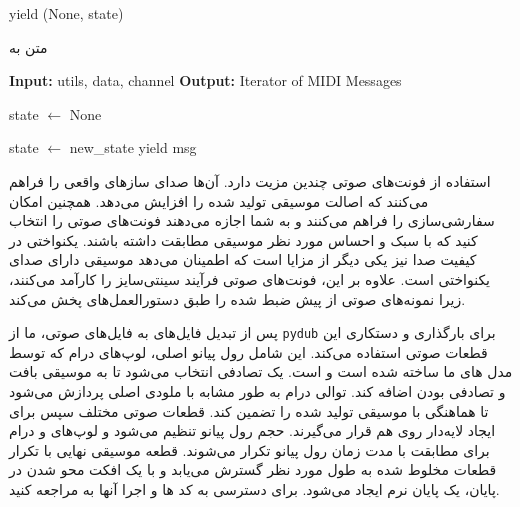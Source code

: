 \begin{LTR}
\begin{algorithm}
\begin{algorithmic}[1]
                  \State yield (None, state)
            \end{algorithmic}
      \end{algorithm}

      \begin{algorithm}
            \setmainfont{Times New Roman}
            \caption{متن به }
            \label{al:strMidi}
            \begin{algorithmic}[1]
                  \State \textbf{Input:} utils, data, channel
                  \State \textbf{Output:} Iterator of MIDI Messages

                  \State state $\leftarrow$ None

                  \State state $\leftarrow$ new\_state
                  \State yield msg
                  \EndIf
                  \EndFor
                  \EndFor

            \end{algorithmic}
      \end{algorithm}
\end{LTR}

استفاده از فونت‌های صوتی چندین مزیت دارد. آن‌ها صدای سازهای واقعی را فراهم
می‌کنند که اصالت موسیقی تولید شده را افزایش می‌دهد. همچنین امکان
سفارشی‌سازی را فراهم می‌کنند و به شما اجازه می‌دهند فونت‌های صوتی را انتخاب
کنید که با سبک و احساس مورد نظر موسیقی مطابقت داشته باشند. یکنواختی در
کیفیت صدا نیز یکی دیگر از مزایا است که اطمینان می‌دهد موسیقی دارای صدای
یکنواختی است. علاوه بر این، فونت‌های صوتی فرآیند سینتی‌سایز را کارآمد
می‌کنند، زیرا  نمونه‌های صوتی از پیش ضبط شده را طبق
دستورالعمل‌های  پخش می‌کند.

پس از تبدیل فایل‌های  به فایل‌های صوتی، ما از \texttt{pydub} برای
بارگذاری و دستکاری این قطعات صوتی استفاده می‌کند. این شامل رول پیانو
اصلی، لوپ‌های درام که توسط مدل های ما ساخته شده است و   است. یک  تصادفی انتخاب می‌شود
تا به موسیقی بافت و تصادفی بودن اضافه کند. توالی درام به طور مشابه با
ملودی اصلی پردازش می‌شود تا هماهنگی با موسیقی تولید شده را تضمین کند.
قطعات صوتی مختلف سپس برای ایجاد لایه‌دار روی هم قرار
می‌گیرند. حجم رول پیانو تنظیم می‌شود و لوپ‌های  و درام برای مطابقت با
مدت زمان رول پیانو تکرار می‌شوند. قطعه موسیقی نهایی با تکرار قطعات مخلوط
شده به طول مورد نظر گسترش می‌یابد و با یک افکت محو شدن در پایان، یک پایان
نرم ایجاد می‌شود. برای دسترسی به کد ها و اجرا آنها به  مراجعه کنید.

